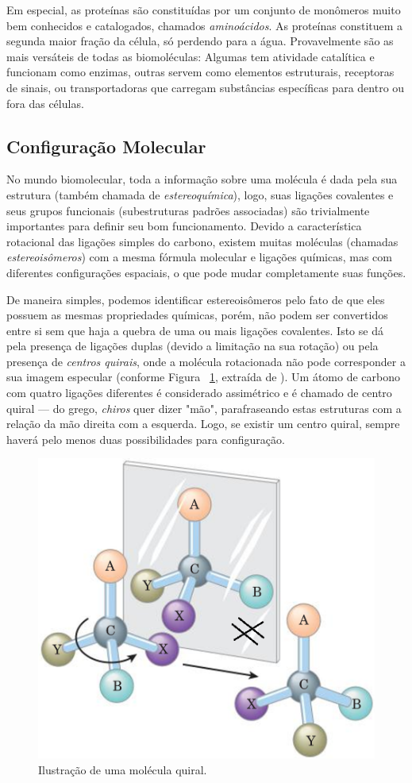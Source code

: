 \documentclass[a4paper,12pt]{article}
\begin{document}
	Em especial, as proteínas são constituídas por um conjunto de monômeros muito bem conhecidos e catalogados, chamados \textit{aminoácidos}. As proteínas constituem a segunda maior fração da célula, só perdendo para a água. Provavelmente são as mais versáteis de todas as biomoléculas: Algumas tem atividade catalítica e funcionam como enzimas, outras servem como elementos estruturais, receptoras de sinais, ou transportadoras que carregam substâncias específicas para dentro ou fora das células.  
	
	\subsection{Configuração Molecular}
	No mundo biomolecular, toda a informação sobre uma molécula é dada pela sua estrutura (também chamada de \textit{estereoquímica}), logo, suas ligações covalentes e seus grupos funcionais (subestruturas padrões associadas) são trivialmente importantes para definir seu bom funcionamento. Devido a característica rotacional das ligações simples do carbono, existem muitas moléculas (chamadas \textit{estereoisômeros}) com a mesma fórmula molecular e ligações químicas, mas com diferentes configurações espaciais, o que pode mudar completamente suas funções. 
	
	De maneira simples, podemos identificar estereoisômeros pelo fato de que eles possuem as mesmas propriedades químicas, porém, não podem ser convertidos entre si sem que haja a quebra de uma ou mais ligações covalentes. Isto se dá pela presença de ligações duplas (devido a limitação na sua rotação) ou pela presença de \textit{centros quirais}, onde a molécula rotacionada não pode corresponder a sua imagem especular (conforme Figura ~\ref{fig:quiral}, extraída de \cite{bioquimicaLehninger}). Um átomo de carbono com quatro ligações diferentes é considerado assimétrico e é chamado de centro quiral --- do grego, \textit{chiros} quer dizer "mão", parafraseando estas estruturas com a relação da mão direita com a esquerda. Logo, se existir um centro quiral, sempre haverá pelo menos duas possibilidades para configuração.
	 
	\begin{figure}[H]
		\begin{center}
			\includegraphics[width=0.45\linewidth]{quiral.png}
		\end{center}
		\caption{Ilustração de uma molécula quiral.}
		\label{fig:quiral}
	\end{figure} 
	
\end{document}
